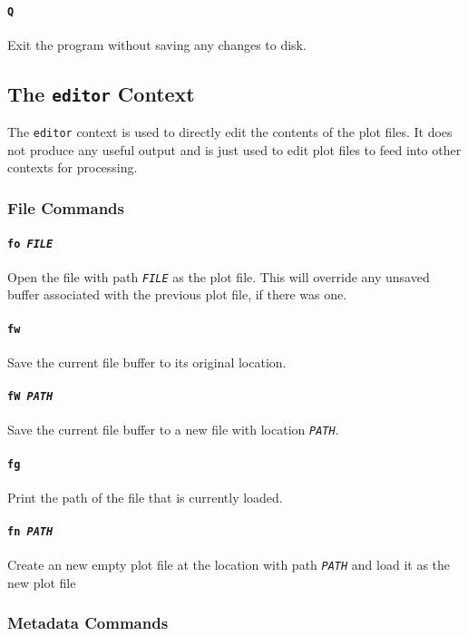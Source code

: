 \documentclass[a4paper]{article}
\begin{document}
\paragraph{\texttt{Q}}
Exit the program without saving any changes to disk.

\subsection{The \texttt{editor} Context}
The \texttt{editor} context is used to directly edit the contents of the 
plot files. It does not produce any useful output and is just used to edit 
plot files to feed into other contexts for processing.

\subsubsection{File Commands}

\paragraph{\texttt{fo \textit{FILE}}}
Open the file with path \texttt{\textit{FILE}} as the plot file. This will 
override any unsaved buffer associated with the previous plot file, if 
there was one.

\paragraph{\texttt{fw}}
Save the current file buffer to its original location.

\paragraph{\texttt{fW \textit{PATH}}}
Save the current file buffer to a new file with location 
\texttt{\textit{PATH}}.

\paragraph{\texttt{fg}}
Print the path of the file that is currently loaded.

\paragraph{\texttt{fn \textit{PATH}}}
Create an new empty plot file at the location with path \texttt{\textit{PATH}} 
and load it as the new plot file

\subsubsection{Metadata Commands}
\end{document}
